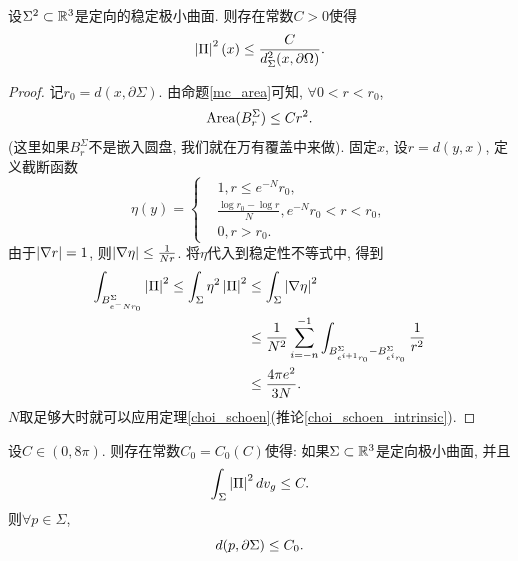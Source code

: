 \begin{theorem}
    设$\Sigma^2 \subset \R^3$是定向的稳定极小曲面. 则存在常数$C>0$使得
    \begin{equation}
        \abs{\II}^2(x) \le \frac{C}{d^2_\Sigma(x,\partial \Omega)}.
    \end{equation}
\end{theorem}
\begin{proof}
    记$r_0=d(x,\partial \Sigma)$. 由命题\eqref{mc_area}可知, $\forall 0<r < r_0$, 
    \begin{equation}
        \Area(B^\Sigma_r) \le Cr^2.
    \end{equation}
    (这里如果$B^\Sigma_r$不是嵌入圆盘, 我们就在万有覆盖中来做). 固定$x$, 设$r=d(y,x)$, 定义截断函数
    \begin{equation}
        \eta(y)=\left\{
            \begin{aligned}
                & 1, r\le e^{-N}r_0, \\
                & \frac{\log r_0-\log r}{N}, e^{-N}r_0 < r < r_0, \\
                & 0, r>r_0.
            \end{aligned}
        \right.
    \end{equation}
    由于$\abs{\nabla r}=1$, 则$\abs{\nabla \eta} \le \frac{1}{Nr}$. 将$\eta$代入到稳定性不等式中, 得到
    \begin{equation}
        \begin{split}
            \int_{B^\Sigma_{e^-Nr_0}}\abs{\II}^2 \le \int_\Sigma \eta^2 \abs{\II}^2 &\le \int_\Sigma \abs{\nabla \eta}^2  \\
            &\le \frac{1}{N^2}\sum_{i=-n}^{-1}\int_{B_{e^{i+1}r_0}^\Sigma-B_{e^ir_0}^\Sigma}\frac{1}{r^2} \\
            &\le \frac{4\pi e^2}{3N}.
        \end{split}
    \end{equation}
    $N$取足够大时就可以应用定理\eqref{choi_schoen}(推论\eqref{choi_schoen_intrinsic}).
\end{proof}
\begin{theorem} \label{curvature_estimate_4pi}
    设$C \in (0,8\pi)$. 则存在常数$C_0=C_0(C)$使得: 如果$\Sigma \subset \R^3$是定向极小曲面, 并且
    \begin{equation}
        \int_\Sigma \abs{\II}^2 dv_g \le C.
    \end{equation}
    则$\forall p \in \Sigma$,
    \begin{equation}
        d(p,\P \Sigma) \le C_0.
    \end{equation}
\end{theorem}
